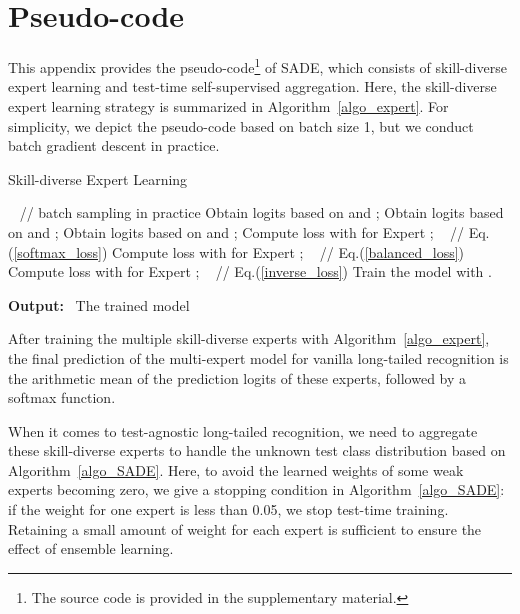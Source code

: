 \documentclass{article}
\newcommand{\return}{\textbf{Output:}}
\begin{document}
\clearpage
\section{Pseudo-code}\label{App_B}
This appendix provides the pseudo-code\footnote{The source code is  provided in the supplementary material.} of  SADE, which consists of  skill-diverse expert learning and test-time  self-supervised aggregation. Here, the skill-diverse expert learning strategy is summarized in Algorithm~\ref{algo_expert}. For simplicity, we depict the pseudo-code based on batch size 1, but we conduct batch gradient descent in practice. 


  
 
\begin{algorithm} 
\caption{Skill-diverse Expert Learning}
\label{algo_expert} 
\begin{algorithmic}[1]
\small
{}
\For{}  ~ // batch sampling in practice 
\State Obtain logits  based on  and ;    
\State Obtain logits  based on  and ;    
\State Obtain logits  based on  and ;    
\State Compute   loss  with  for Expert ; ~ // Eq.(\ref{softmax_loss})
\State Compute loss  with  for Expert ; ~ // Eq.(\ref{balanced_loss})
\State Compute loss  with  for Expert ; ~ // Eq.(\ref{inverse_loss})
\State Train the model with .
\EndFor
\EndFor 

\hspace{-0.5in}\return ~ The trained model   
\end{algorithmic} 
\end{algorithm}

After training the multiple skill-diverse experts with Algorithm~\ref{algo_expert},  the final prediction of the multi-expert model for vanilla long-tailed recognition is the arithmetic mean  of the prediction logits of these experts, followed by a softmax function. 

When it comes to test-agnostic long-tailed recognition, we need to aggregate these skill-diverse experts to handle the unknown test class distribution based on Algorithm~\ref{algo_SADE}.
Here, to avoid  the learned weights of some weak experts becoming zero, we give a stopping condition in Algorithm~\ref{algo_SADE}: if the weight for one expert is less than 0.05, we stop test-time training. Retaining a small amount of weight for each expert is sufficient to ensure the effect of  ensemble learning.  
 
\end{document}
